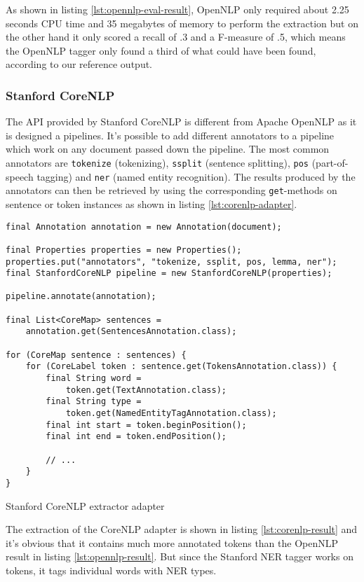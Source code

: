 As shown in listing \ref{lst:opennlp-eval-result}, OpenNLP only required about 2.25 seconds CPU time and 35 megabytes of memory to perform the extraction but on the other hand it only scored a recall of .3 and a F-measure of .5, which means the OpenNLP tagger only found a third of what could have been found, according to our reference output.

\subsubsection{Stanford CoreNLP}
The \gls{API} provided by Stanford CoreNLP is different from Apache OpenNLP as it is designed a pipelines. It's possible to add different annotators to a pipeline which work on any document passed down the pipeline. The most common annotators are \texttt{tokenize} (tokenizing), \texttt{ssplit} (sentence splitting), \texttt{pos} (part-of-speech tagging) and \texttt{ner} (named entity recognition). The results produced by the annotators can then be retrieved by using the corresponding \texttt{get}-methods on sentence or token instances as shown in listing \ref{lst:corenlp-adapter}.

\begin{listing}[H]
\begin{verbatim}
final Annotation annotation = new Annotation(document);

final Properties properties = new Properties();
properties.put("annotators", "tokenize, ssplit, pos, lemma, ner");
final StanfordCoreNLP pipeline = new StanfordCoreNLP(properties);

pipeline.annotate(annotation);

final List<CoreMap> sentences = 
    annotation.get(SentencesAnnotation.class);

for (CoreMap sentence : sentences) {
    for (CoreLabel token : sentence.get(TokensAnnotation.class)) {
        final String word = 
            token.get(TextAnnotation.class);
        final String type = 
            token.get(NamedEntityTagAnnotation.class);
        final int start = token.beginPosition();
        final int end = token.endPosition();

        // ...
    }
}
\end{verbatim}
\caption{Stanford CoreNLP extractor adapter}
\label{lst:corenlp-adapter}
\end{listing}

\newpage
The extraction of the CoreNLP adapter is shown in listing \ref{lst:corenlp-result} and it's obvious that it contains much more annotated tokens than the OpenNLP result in listing \ref{lst:opennlp-result}. But since the Stanford \gls{NER} tagger works on tokens, it tags individual words with \gls{NER} types.

